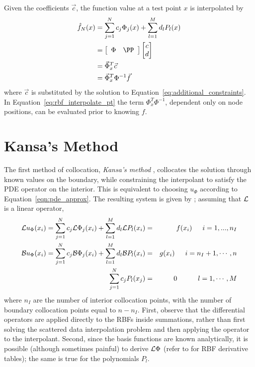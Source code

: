 \documentclass{report}
\begin{document}
{Given the coefficients $\vec{c}$, the function value at a test point $x$ is interpolated by
\begin{align}	 
	\hat{f}_N(x) &= \sum_{j=1}^{N}c_j \Phi_j(x) + \sum_{l=1}^{M}d_l P_l(x)  \nonumber \\
	&=  \left[\begin{array}{cc}
        \Phi & \PP
	\end{array} \right] 
	 \begin{bmatrix}	c \\
					d
		 \end{bmatrix} \nonumber \\
						 &= \vec{\Phi}_x^T \vec{c} \nonumber \\
						 &= \vec{\Phi}_x^T \Phi^{-1}\vec{f}	
						 \label{eq:rbf_interpolate_pt}
\end{align}
where $\vec{c}$ is substituted by the solution to Equation~\ref{eq:additional_constraints}. In Equation~\ref{eq:rbf_interpolate_pt} the term $\Phi_{x}^T\Phi^{-1}$, dependent only on node positions, can be evaluated prior to knowing $f$. 



\section{Kansa's Method}

The first method of collocation, \emph{Kansa's method} \cite{Kansa:1990a, Kansa:1990b}, collocates the solution through known values on the boundary, while constraining the interpolant to satisfy the PDE operator on the interior. This is equivalent to choosing $u_\Phi$ according to Equation~\ref{eqn:pde_approx}. The resulting system is given by \cite{Mouat:2002}; assuming that $\mathcal{L}$ is a linear operator, 
\begin{eqnarray}
\mathcal{L}u_\Phi(x_i) = \sum_{j=1}^{N}c_j\mathcal{L}\Phi_j(x_i) + \sum_{l=1}^{M}d_l \mathcal{L}P_l(x_i) &=&f(x_i)  \hskip1.5em i = 1,...,n_I  \label{eqn:kansa_interior} \\ 
\mathcal{B}u_\Phi(x_i) = \sum_{j=1}^{N}c_j \mathcal{B}\Phi_j(x_i) + \sum_{l=1}^{M}d_l \mathcal{B}P_l(x_i) &=& g(x_i)  \hskip1.5em i = n_I + 1, \cdots, n \label{eqn:kansa_boundary} \\
\sum_{j=1}^{N} c_j P_l(x_j) & = & 0 \hskip3.0em l=1,\cdots,M \label{eqn:kansa_moments} 
\end{eqnarray}
where $n_I$ are the number of interior collocation points, with the number of boundary collocation points equal to $n - n_I$. First, observe that the differential operators are applied directly to the RBFs inside summations, rather than first solving the scattered data interpolation problem and then applying the operator to the interpolant.  Second, since the basis functions are known analytically, it is possible (although sometimes painful) to derive $\mathcal{L}\Phi$ (refer to \cite{Fasshauer:2007} for RBF derivative tables); the same is true for the polynomials $P_l$. 

}
\end{document}
